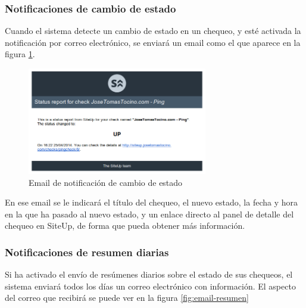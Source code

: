 \subsubsection{Notificaciones de cambio de estado}

Cuando el sistema detecte un cambio de estado en un chequeo, y esté activada la
notificación por correo electrónico, se enviará un email como el que aparece en
la figura \ref{fig:email-estado}.

\begin{figure}[hbtp]
  \centering
  \includegraphics[width=0.7\textwidth]{apendice_manual_usuario/email_estado.png}
  \caption{Email de notificación de cambio de estado}
  \label{fig:email-estado}
\end{figure}

En ese email se le indicará el título del chequeo, el nuevo estado, la fecha y
hora en la que ha pasado al nuevo estado, y un enlace directo al panel de
detalle del chequeo en SiteUp, de forma que pueda obtener más información.

\subsubsection{Notificaciones de resumen diarias}

Si ha activado el envío de resúmenes diarios sobre el estado de sus chequeos, el
sistema enviará todos los días un correo electrónico con información. El aspecto
del correo que recibirá se puede ver en la figura \ref{fig:email-resumen}

